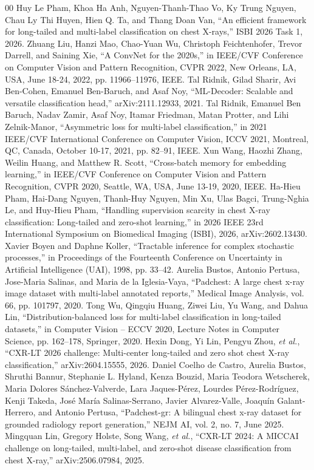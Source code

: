 \documentclass[conference]{IEEEtran}
\begin{document}
\begin{thebibliography}{00}
 Huy Le Pham, Khoa Ha Anh, Nguyen-Thanh-Thao Vo, Ky Trung Nguyen, Chau Ly Thi Huyen, Hien Q. Ta, and Thang Doan Van, ``An efficient framework for long-tailed and multi-label classification on chest X-rays,'' ISBI 2026 Task 1, 2026.
 Zhuang Liu, Hanzi Mao, Chao-Yuan Wu, Christoph Feichtenhofer, Trevor Darrell, and Saining Xie, ``A ConvNet for the 2020s,'' in IEEE/CVF Conference on Computer Vision and Pattern Recognition, CVPR 2022, New Orleans, LA, USA, June 18-24, 2022, pp. 11966--11976, IEEE.
 Tal Ridnik, Gilad Sharir, Avi Ben-Cohen, Emanuel Ben-Baruch, and Asaf Noy, ``ML-Decoder: Scalable and versatile classification head,'' arXiv:2111.12933, 2021.
 Tal Ridnik, Emanuel Ben Baruch, Nadav Zamir, Asaf Noy, Itamar Friedman, Matan Protter, and Lihi Zelnik-Manor, ``Asymmetric loss for multi-label classification,'' in 2021 IEEE/CVF International Conference on Computer Vision, ICCV 2021, Montreal, QC, Canada, October 10-17, 2021, pp. 82--91, IEEE.
 Xun Wang, Haozhi Zhang, Weilin Huang, and Matthew R. Scott, ``Cross-batch memory for embedding learning,'' in IEEE/CVF Conference on Computer Vision and Pattern Recognition, CVPR 2020, Seattle, WA, USA, June 13-19, 2020, IEEE.
 Ha-Hieu Pham, Hai-Dang Nguyen, Thanh-Huy Nguyen, Min Xu, Ulas Bagci, Trung-Nghia Le, and Huy-Hieu Pham, ``Handling supervision scarcity in chest X-ray classification: Long-tailed and zero-shot learning,'' in 2026 IEEE 23rd International Symposium on Biomedical Imaging (ISBI), 2026, arXiv:2602.13430.
 Xavier Boyen and Daphne Koller, ``Tractable inference for complex stochastic processes,'' in Proceedings of the Fourteenth Conference on Uncertainty in Artificial Intelligence (UAI), 1998, pp. 33--42.
 Aurelia Bustos, Antonio Pertusa, Jose-Maria Salinas, and Maria de la Iglesia-Vaya, ``Padchest: A large chest x-ray image dataset with multi-label annotated reports,'' Medical Image Analysis, vol. 66, pp. 101797, 2020.
 Tong Wu, Qingqiu Huang, Ziwei Liu, Yu Wang, and Dahua Lin, ``Distribution-balanced loss for multi-label classification in long-tailed datasets,'' in Computer Vision -- ECCV 2020, Lecture Notes in Computer Science, pp. 162--178, Springer, 2020.
 Hexin Dong, Yi Lin, Pengyu Zhou, \textit{et al.}, ``CXR-LT 2026 challenge: Multi-center long-tailed and zero shot chest X-ray classification,'' arXiv:2604.15555, 2026.
 Daniel Coelho de Castro, Aurelia Bustos, Shruthi Bannur, Stephanie L. Hyland, Kenza Bouzid, Maria Teodora Wetscherek, Maria Dolores S\'anchez-Valverde, Lara Jaques-P\'erez, Lourdes P\'erez-Rodr\'iguez, Kenji Takeda, Jos\'e Mar\'ia Salinas-Serrano, Javier Alvarez-Valle, Joaqu\'in Galant-Herrero, and Antonio Pertusa, ``Padchest-gr: A bilingual chest x-ray dataset for grounded radiology report generation,'' NEJM AI, vol. 2, no. 7, June 2025.
 Mingquan Lin, Gregory Holste, Song Wang, \textit{et al.}, ``CXR-LT 2024: A MICCAI challenge on long-tailed, multi-label, and zero-shot disease classification from chest X-ray,'' arXiv:2506.07984, 2025.
\end{thebibliography}
\end{document}

